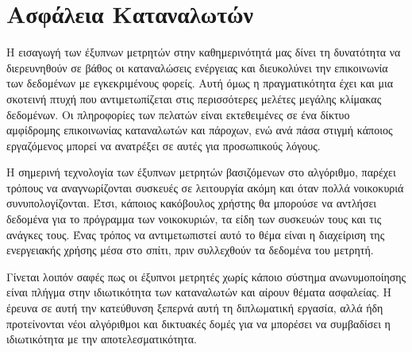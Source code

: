 \section{Ασφάλεια Καταναλωτών}
Η εισαγωγή των έξυπνων μετρητών στην καθημερινότητά μας δίνει τη δυνατότητα να διερευνηθούν σε βάθος οι καταναλώσεις ενέργειας και διευκολύνει την επικοινωνία των δεδομένων με εγκεκριμένους φορείς. Αυτή όμως η πραγματικότητα έχει και μια σκοτεινή πτυχή που αντιμετωπίζεται στις περισσότερες μελέτες μεγάλης κλίμακας δεδομένων. Οι πληροφορίες των πελατών είναι εκτεθειμένες σε ένα δίκτυο αμφίδρομης επικοινωνίας καταναλωτών και πάροχων, ενώ ανά πάσα στιγμή κάποιος εργαζόμενος μπορεί να ανατρέξει σε αυτές για προσωπικούς λόγους.\par
Η σημερινή τεχνολογία των έξυπνων μετρητών βασιζόμενων στο  αλγόριθμο, παρέχει τρόπους να αναγνωρίζονται συσκευές σε λειτουργία ακόμη και όταν πολλά νοικοκυριά συνυπολογίζονται. Έτσι, κάποιος κακόβουλος χρήστης θα μπορούσε να αντλήσει δεδομένα για το πρόγραμμα των νοικοκυριών, τα είδη των συσκευών τους και τις ανάγκες τους. Ένας τρόπος να αντιμετωπιστεί αυτό το θέμα είναι η διαχείριση της ενεργειακής χρήσης μέσα στο σπίτι, πριν συλλεχθούν τα δεδομένα του μετρητή.\par
Γίνεται λοιπόν σαφές πως οι έξυπνοι μετρητές χωρίς κάποιο σύστημα ανωνυμοποίησης είναι πλήγμα στην ιδιωτικότητα των καταναλωτών και αίρουν θέματα ασφαλείας. Η έρευνα σε αυτή την κατεύθυνση ξεπερνά αυτή τη διπλωματική εργασία, αλλά ήδη προτείνονται νέοι αλγόριθμοι και δικτυακές δομές για να μπορέσει να συμβαδίσει η ιδιωτικότητα με την αποτελεσματικότητα.

